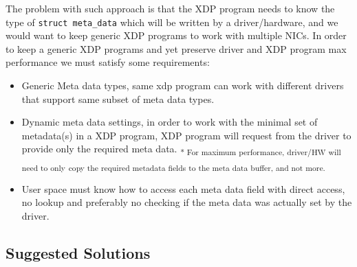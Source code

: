 \documentclass[letterpaper]{article}
\begin{document}
The problem with such approach is that the XDP program needs to know the type of \small{\texttt{struct meta\_data}} which will be written by a driver/hardware, and we would want to keep generic XDP programs to work with multiple NICs.
\newline
\newline
In order to keep a generic XDP programs and yet preserve driver and XDP program max performance we must satisfy some requirements:
\begin{itemize}
	\item Generic Meta data types, same xdp program can work with different drivers that support same subset of meta data types.
	\item Dynamic meta data settings, in order to work with the minimal set of metadata(s) in a XDP program, XDP program will request from the driver to provide only the required meta data. \textsubscript{* For maximum performance, driver/HW will need to only}
	\textsubscript{copy the required metadata fields to the meta data buffer, and not more.}
	\item User space must know how to access each meta data field with direct access, no lookup and preferably no checking if the meta data was actually set by the driver.
\end{itemize}

\subsection{Suggested Solutions}
\end{document}
